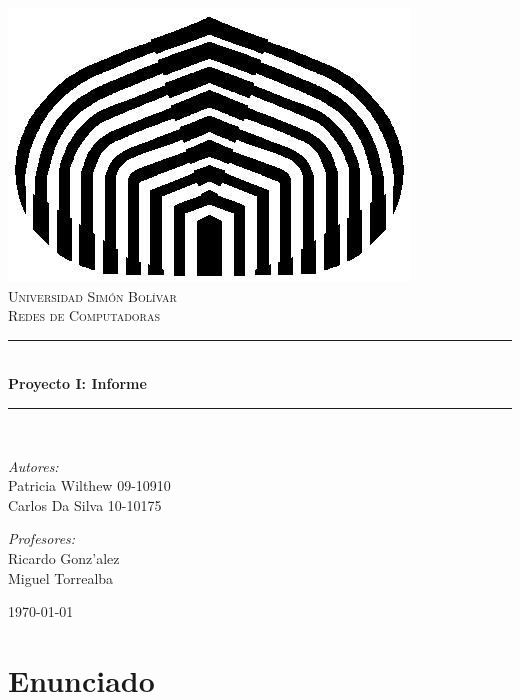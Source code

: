 \documentclass[11pt, spanish]{extarticle}
\newcommand{\HRule}{\rule{\linewidth}{0.5mm}}
\begin{document}
\begin{titlepage}
\begin{center}
\includegraphics[scale=0.25]{USB.jpeg}~\\[1cm]

\textsc{\LARGE Universidad Simón Bolívar}\\[1.5cm]
\textsc{\Large Redes de Computadoras}\\[1.5cm]

\HRule \\[0.4cm]
{ \huge \bfseries Proyecto I: Informe\\[0.4cm] }

\HRule \\[1.5cm]
\begin{minipage}{0.4\textwidth}
\begin{flushleft} \large
\emph{Autores:}\\
Patricia Wilthew 09-10910 \\Carlos Da Silva 10-10175 \\
\end{flushleft}
\end{minipage}
\begin{minipage}{0.4\textwidth}
\begin{flushright} \large
\emph{Profesores:} \\
Ricardo Gonz'alez \\ Miguel Torrealba
\end{flushright}
\end{minipage}

\vfill
{\large \today}
\end{center}
\end{titlepage}


\tableofcontents
\newpage

\setlength\parindent{24pt}

\section{Enunciado}
\end{document}
